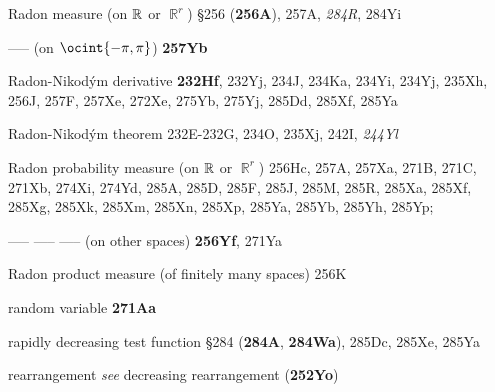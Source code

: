 

{Radon measure}
(on $\Bbb R$ or $\BbbR^r$)
\S256 ({\bf 256A}), 257A, {\it 284R}, 284Yi 


----- (on $\ocint{-\pi,\pi}$) {\bf 257Yb}




Radon-Nikod\'ym derivative {\bf 232Hf}, 232Yj,
234J, 234Ka, 234Yi, 234Yj, 235Xh, 256J, 257F, 257Xe,
272Xe, 275Yb, 275Yj,
285Dd, 285Xf, 285Ya


Radon-Nikod\'ym theorem 232E-232G, 
234O, 235Xj, 242I, {\it 244Yl}


Radon probability measure (on $\Bbb R$ or $\BbbR^r$) 256Hc, 257A,
257Xa, 271B, 271C, 271Xb, 274Xi, 274Yd,
285A, 285D, 285F, 285J, 285M, 285R, 285Xa, 285Xf, 285Xg, 285Xk, 285Xm,
285Xn, 285Xp, 285Ya, 285Yb, 285Yh, 285Yp; 


----- ----- ----- (on other spaces) {\bf 256Yf}, 271Ya


Radon product measure (of finitely many spaces) 256K















random variable {\bf 271Aa}














rapidly decreasing test function \S284 ({\bf 284A}, {\bf 284Wa}),
285Dc, 285Xe, 285Ya




















rearrangement {\it see} decreasing rearrangement ({\bf 252Yo})














